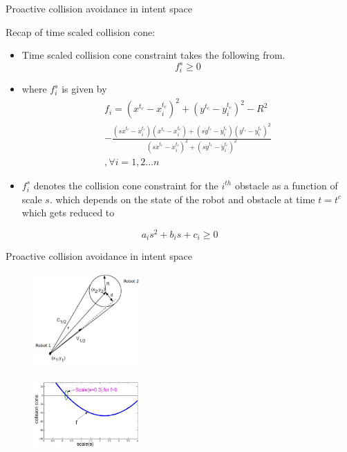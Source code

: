 \documentclass{beamer}
\begin{document}
\begin{frame}{Proactive collision avoidance in intent space}
\begin{block}{Recap of time scaled collision cone:}
\begin{itemize}
\item{Time scaled collision cone constraint takes the following from.}
$$f_i^s \geq 0 $$
\item{where $f_i^s$ is given by}
\begin{eqnarray}\label{collcone}
 f_i= (x^{t_c}-x_i^{t_c})^2+(y^{t_c}-y_i^{t_c})^2- R^2\\ \nonumber- \frac{(s\dot{x}^{t_c}-\dot{x}_i^{t_c})(x^{t_c}-x_i^{t_c})+(s\dot{y}^{t_c}-\dot{y}_i^{t_c})(y^{t_c}-y_i^{t_c})^2}{(s\dot{x}^{t_c}-\dot{x}_i^{t_c})^2+(s\dot{y}^{t_c}-\dot{y}_i^{t_c})^2} \\\nonumber, \forall i = {1,2...n}
\end{eqnarray}

\item{$f_i^s$ denotes the collision cone constraint for the $i^{th}$ obstacle as a function of scale $s$. which depends on the state of the robot and obstacle at time $t=t^c$ which gets reduced to}
\end{itemize}
$$a_is^2+b_is+c_i \geq 0 $$
\end{block}
\end{frame}
\begin{frame}{Proactive collision avoidance in intent space}
\begin{figure}
\centering
\includegraphics[width= 4.1cm, height=3.5cm]{fig3.eps}
\\
\includegraphics[width= 4.1cm, height=3.5cm]{fig4.eps}
\end{figure}

\end{frame}
\end{document}
